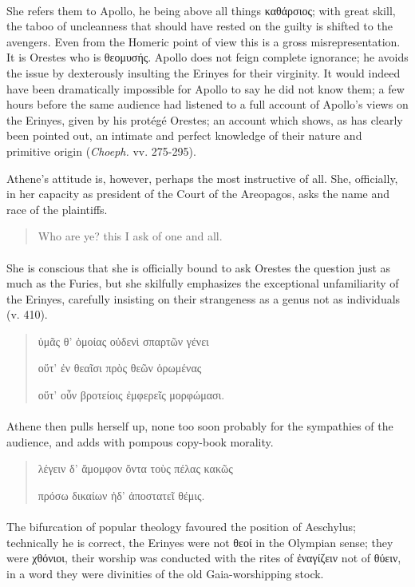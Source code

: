 \documentclass[a4paper, 11pt, oneside, polutonikogreek, english]{article}
\begin{document}
\paragraph{}
She refers them to Apollo, he being above all things καθάρσιος; with great skill, the taboo of uncleanness that should have rested on the guilty is shifted to the avengers. Even from the Homeric point of view this is a gross misrepresentation. It is Orestes who is θεομυσής. Apollo does not feign complete ignorance; he avoids the issue by dexterously insulting the Erinyes for their virginity. It would indeed have been dramatically impossible for Apollo to say he did not know them; a few hours before the same audience had listened to a full account of Apollo's views on the Erinyes, given by his protégé Orestes; an account which shows, as has clearly been pointed out, an intimate and perfect knowledge of their nature and primitive origin (\emph{Choeph.} vv. 275-295).

Athene's attitude is, however, perhaps the most instructive of all. She, officially, in her capacity as president of the Court of the Areopagos, asks the name and race of the plaintiffs.
\begin{quotation}
Who are ye? this I ask of one and all.
\end{quotation}
\paragraph{}
She is conscious that she is officially bound to ask Orestes the question just as much as the Furies, but she skilfully emphasizes the exceptional unfamiliarity of the Erinyes, carefully insisting on their strangeness as a genus not as individuals (v. 410).
\begin{quotation}
ὑμᾶς θ' ὁμοίας οὐδενὶ σπαρτῶν γένει

οὔτ' ἐν θεαῖσι πρὸς θεῶν ὁρωμένας

οὔτ' οὖν βροτείοις ἐμφερεῖς μορφώμασι.
\end{quotation}
\paragraph{}
Athene then pulls herself up, none too soon probably for the sympathies of the audience, and adds with pompous copy-book morality.
\begin{quotation}
λέγειν δ' ἄμομφον ὄντα τοὺς πέλας κακῶς

πρόσω δικαίων ἠδ' ἀποστατεῖ θέμις.
\end{quotation}
\paragraph{}
The bifurcation of popular theology favoured the position of Aeschylus; technically he is correct, the Erinyes were not θεοί in the Olympian sense; they were χθόνιοι, their worship was conducted with the rites of ἐναγίζειν not of θύειν, in a word they were divinities of the old Gaia-worshipping stock.
\end{document}
